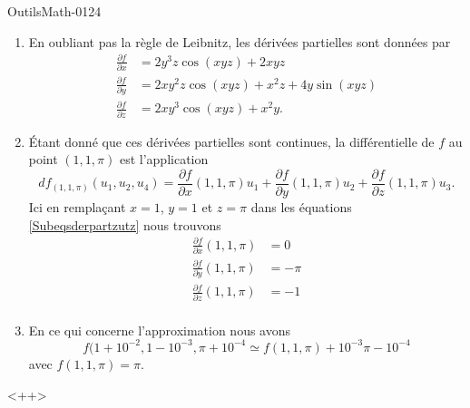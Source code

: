 
\begin{corrige}{OutilsMath-0124}

    \begin{enumerate}
        \item
            En oubliant pas la règle de Leibnitz, les dérivées partielles sont données par
            \begin{subequations}        \label{Subeqsderpartzutz}
                \begin{align}
                    \frac{ \partial f }{ \partial x }&=2y^3z\cos(xyz)+2xyz\\
                    \frac{ \partial f }{ \partial y }&=2xy^2z\cos(xyz)+x^2z+4y\sin(xyz)\\
                    \frac{ \partial f }{ \partial z }&=2xy^3\cos(xyz)+x^2y.
                \end{align}
            \end{subequations}
        \item 
            Étant donné que ces dérivées partielles sont continues, la différentielle de \( f\) au point \( (1,1,\pi)\) est l'application
            \begin{equation}
                df_{(1,1,\pi)}(u_1,u_2,u_4)=\frac{ \partial f }{ \partial x }(1,1,\pi)u_1+\frac{ \partial f }{ \partial y }(1,1,\pi)u_2+\frac{ \partial f }{ \partial z }(1,1,\pi)u_3.
            \end{equation}
            Ici en remplaçant \( x=1\), \( y=1\) et $z=\pi$ dans les équations \eqref{Subeqsderpartzutz} nous trouvons
            \begin{subequations}
                \begin{align}
                    \frac{ \partial f }{ \partial x }(1,1,\pi)&=0\\
                    \frac{ \partial f }{ \partial y }(1,1,\pi)&=-\pi\\
                    \frac{ \partial f }{ \partial z }(1,1,\pi)&=-1\\
                \end{align}
            \end{subequations}
        \item
            En ce qui concerne l'approximation nous avons
            \begin{equation}
                f(1+10^{-2},1-10^{-3},\pi+10^{-4}\simeq f(1,1,\pi)+10^{-3}\pi-10^{-4}
            \end{equation}
            avec \( f(1,1,\pi)=\pi\).
    \end{enumerate}
    <++>

\end{corrige}
